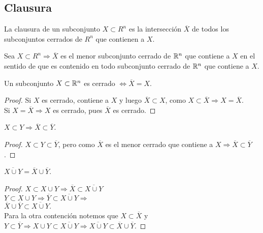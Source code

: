 \subsection{Clausura}

\begin{definition}[Clausura]
  La clausura de un subconjunto \(X \subset R^n\) es la intersección \(\overline{X} \) de todos los subconjuntos cerrados de \(R^n\) que contienen a \(X\).
\end{definition}

\begin{prop}
  Sea \(X \subset R^n \Rightarrow \overline{X} \) es el menor subconjunto cerrado de \(\mathbb{R}^n\) que contiene a \(X\) en el sentido de que es contenido en todo subconjunto cerrado de \(\mathbb{R}^n\) que contiene a \(X\).
\end{prop}

\begin{corollary}
  Un subconjunto \(X \subset \mathbb{R}^n\) es cerrado \(\iff \overline{X} = X\).
  \begin{proof}
    Si \(X\) es cerrado, contiene a \(X\) y luego \(\overline{X} \subset X\), como \(X \subset \overline{X} \Rightarrow X = \overline{X} \). \\
    Si \(X = \overline{X} \Rightarrow X\) es cerrado, pues \(\overline{X} \) es cerrado.
  \end{proof}
\end{corollary}

\begin{prop}
  \(X \subset Y \Rightarrow \overline{X} \subset \overline{Y} \).
  \begin{proof}
    \(X \subset Y \subset \overline{Y} \), pero como \(\overline{X} \) es el menor cerrado que contiene a \(X \Rightarrow \overline{X} \subset \overline{Y} \).
  \end{proof}
\end{prop}

\begin{prop}
  \(\overline{X \cup Y} = \overline{X} \cup \overline{Y} \).
  \begin{proof}
    \(X \subset X \cup Y \Rightarrow \overline{X} \subset \overline{X \cup Y} \) \\
    \(Y \subset X \cup Y \Rightarrow \overline{Y} \subset \overline{X \cup Y} \Rightarrow \) \\
    \(\overline{X} \cup \overline{Y} \subset \overline{X \cup Y} \). \\
    Para la otra contención notemos que \(X \subset \overline{X} \) y \(Y \subset \overline{Y} \Rightarrow X \cup Y \subset \overline{X \cup Y} \Rightarrow \overline{X \cup Y} \subset \overline{X} \cup \overline{Y} \).
  \end{proof}
\end{prop}

